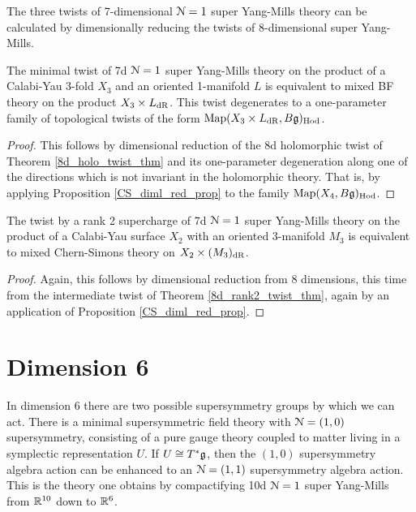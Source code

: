 \documentclass[10pt, oneside]{article}
\begin{document}
The three twists of 7-dimensional $\mathcal{N}=1$ super Yang-Mills theory can be calculated by dimensionally reducing the twists of 8-dimensional super Yang-Mills.

\begin{theorem} \label{7d_holo_twist_thm}
The minimal twist of 7d $\mathcal{N}=1$ super Yang-Mills theory on the product of a Calabi-Yau 3-fold $X_3$ and an oriented 1-manifold $L$ is equivalent to mixed BF theory on the product $X_3 \times L_{\mathrm{dR}}$. This twist degenerates to a one-parameter family of topological twists of the form $\operatorname{Map}(X_3 \times L_{\mathrm{dR}}, B\mathfrak{g})_{\mathrm{Hod}}$.
\end{theorem}

\begin{proof}
This follows by dimensional reduction of the 8d holomorphic twist of Theorem \ref{8d_holo_twist_thm} and its one-parameter degeneration along one of the directions which is not invariant in the holomorphic theory.  That is, by applying Proposition \ref{CS_diml_red_prop} to the family $\operatorname{Map}(X_4, B\mathfrak{g})_{\mathrm{Hod}}$.
\end{proof}

\begin{theorem} \label{7d_rank2_twist_thm}
The twist by a rank 2 supercharge of 7d $\mathcal{N}=1$ super Yang-Mills theory on the product of a Calabi-Yau surface $X_2$ with an oriented 3-manifold $M_3$ is equivalent to mixed Chern-Simons theory on $X_2 \times (M_3)_{\mathrm{dR}}$. 
\end{theorem}

\begin{proof}
Again, this follows by dimensional reduction from 8 dimensions, this time from the intermediate twist of Theorem \ref{8d_rank2_twist_thm}, again by an application of Proposition \ref{CS_diml_red_prop}.
\end{proof}

\section{Dimension 6}
In dimension 6 there are two possible supersymmetry groups by which we can act.  
There is a minimal supersymmetric field theory with $\mathcal{N}=(1,0)$ supersymmetry, consisting of a pure gauge theory coupled to matter living in a symplectic representation $U$.  
If $U \cong T^*\mathfrak{g}$, then the $(1,0)$ supersymmetry algebra action can be enhanced to an $\mathcal{N}=(1,1)$ supersymmetry algebra action.  
This is the theory one obtains by compactifying 10d $\mathcal{N}=1$ super Yang-Mills from $\mathbb R^{10}$ down to $\mathbb R^6$.
\end{document}
